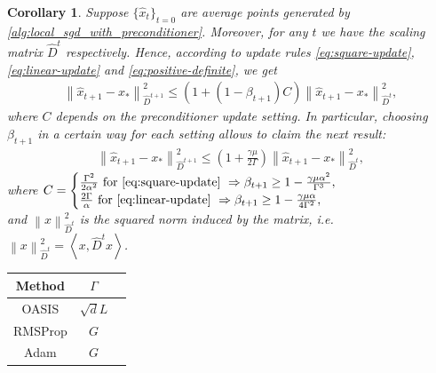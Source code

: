 \documentclass[sn-mathphys,Numbered]{sn-jnl}%
\newtheorem{corollary}{Corollary}
\renewcommand{\|}{\parallel}
\newcommand\ev[1]{\left \langle #1 \right \rangle}
\newcommand{\sqn}[1]{{\left\lVert#1\right\rVert}^2}
\renewcommand {\*} {\ast}
\begin{document}
\begin{corollary}
    \label{cor:equal-convergence}
    Suppose $\{\hat{x}_t\}_{t=0}$ are average points generated by \cref{alg:local_sgd_with_preconditioner}. Moreover, for any $t$ we have the scaling matrix $\hat{D}^{t}$ respectively. Hence, according to update rules \eqref{eq:square-update}, \eqref{eq:linear-update} and \eqref{eq:positive-definite}, we get
    \begin{align*}
        \sqn{\hat{x}_{t+1} - x_\ast}_{\hat{D}^{t+1}} \leq (1 + (1 - \beta_{t+1})C)\sqn{\hat{x}_{t+1} - x_\ast}_{\hat{D}^t},
    \end{align*}
    where $C$ depends on the preconditioner update setting.
    In particular, choosing $\beta_{t+1}$ in a certain way for each setting allows to claim the next result:
    \begin{align*}
        \sqn{\hat{x}_{t+1} - x_\ast}_{\hat{D}^{t+1}} \leq \left(1 + \frac{\gamma\mu}{2\Gamma}\right)\sqn{\hat{x}_{t+1} - x_\ast}_{\hat{D}^{t}},
    \end{align*}
      where $C =
    \begin{cases}
        \frac{\Gamma^2}{2\alpha^2} \text{ for \eqref{eq:square-update} }\Rightarrow \beta_{t+1} \geq 1 - \frac{\gamma\mu\alpha^2}{\Gamma^3},\\
        \frac{2\Gamma}{\alpha} \text{ for \eqref{eq:linear-update} } \Rightarrow \beta_{t+1} \geq 1 - \frac{\gamma\mu\alpha}{4\Gamma^2},
    \end{cases}$\\
    and $\sqn{x}_{\hat{D}^{t}}$ is the squared norm induced by the matrix, i.e. $\sqn{x}_{\hat{D}^{t}} = \ev{x, {\hat{D}^{t}}x}$.
\end{corollary}
\renewcommand{\arraystretch}{2}
\begin{table}[!h]
    \centering
{}
    \label{table_ef}   
    \small
  \begin{threeparttable}
    \begin{tabular}{ccc}
    \toprule
    \textbf{Method} & \textbf{$\Gamma$}  \\
    \midrule
    OASIS & $\sqrt{d}L$ \\\hline
    RMSProp & $G$\\\hline
    Adam  & $G$ \\
    \bottomrule
    \end{tabular}   
     \begin{tablenotes}
     \item 
\end{tablenotes}   
    \end{threeparttable}
\vspace{-0.3cm}
\label{table}
\end{table}
\end{document}
